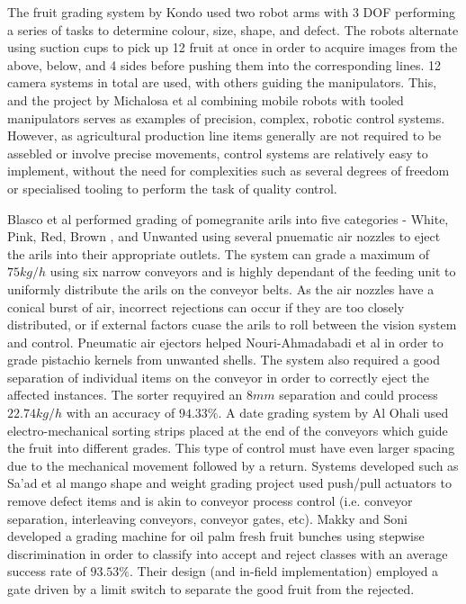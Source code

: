 \documentclass[fleqn,twoside]{article}
\begin{document}
The fruit grading system by Kondo \cite{kondo} used two robot arms with 3 DOF performing a series of tasks to determine colour, size, shape, and defect. The robots alternate using suction cups to pick up 12 fruit at once in order to acquire images from the above, below, and 4 sides before pushing them into the corresponding lines. 12 camera systems in total are used, with others guiding the manipulators. This, and the project by Michalosa et al \cite{michalosa} combining mobile robots with tooled manipulators serves as examples of precision, complex, robotic control systems. However, as agricultural production line items generally are not required to be assebled or involve precise movements, control systems are relatively easy to implement, without the need for complexities such as several degrees of freedom or specialised tooling to perform the task of quality control.  

Blasco et al \cite{blasco} performed grading of pomegranite arils into five categories - White, Pink, Red, Brown , and Unwanted using several pnuematic air nozzles to eject the arils into their appropriate outlets. The system can grade a maximum of $75kg/h$ using six narrow conveyors and is highly dependant of the feeding unit to uniformly distribute the arils on the conveyor belts. As the air nozzles have a conical burst of air, incorrect rejections can occur if they are too closely distributed, or if external factors cuase the arils to roll between the vision system and control. Pneumatic air ejectors helped Nouri-Ahmadabadi et al \cite{nouri-ahmadabadi} in order to grade pistachio kernels from unwanted shells. The system also required a good separation of individual items on the conveyor in order to correctly eject the affected instances. The sorter requyired an $8mm$ separation and could process $22.74kg/h$ with an accuracy of $94.33\%$. A date grading system by Al Ohali \cite{ohali} used electro-mechanical sorting strips placed at the end of the conveyors which guide the fruit into different grades. This type of control must have even larger spacing due to the mechanical movement followed by a return. Systems developed such as Sa'ad et al \cite{saad} mango shape and weight grading project used push/pull actuators to remove defect items and is akin to conveyor process control (i.e. conveyor separation, interleaving conveyors, conveyor gates, etc). Makky and Soni \cite{makky} developed a grading machine for oil palm fresh fruit bunches using stepwise discrimination in order to classify into accept and reject classes with an average success rate of $93.53\%$. Their design (and in-field implementation) employed a gate driven by a limit switch to separate the good fruit from the rejected.
\end{document}
